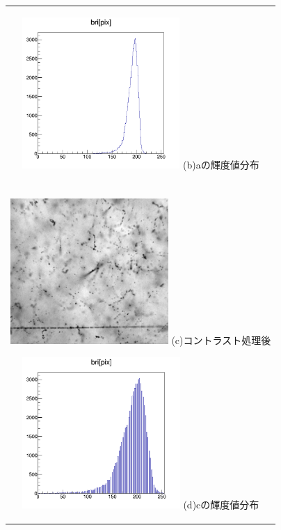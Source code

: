 \documentclass[12pt,a4paper]{jarticle}
\begin{document}
\begin{figure}[htbp]
\begin{center}
\begin{tabular}{c}
        \begin{minipage}{0.5\hsize}
          \begin{center}
            \includegraphics[clip, width=60mm]{row_hist.png}
            \hspace{1.6cm} (b)aの輝度値分布
          \end{center}
        \end{minipage}
        \\
        \\
        \begin{minipage}{0.5\hsize}
            \begin{center}
              \includegraphics[clip, width=60mm]{cont.png}
              \hspace{1.6cm} (c)コントラスト処理後
            \end{center}
          \end{minipage}
          
        \begin{minipage}{0.5\hsize}
            \begin{center}
              \includegraphics[clip, width=60mm]{cont_hist.png}
              \hspace{1.6cm} (d)cの輝度値分布
            \end{center}
        \end{minipage}
    

\end{tabular}
\end{center}
\end{figure}
\end{document}
